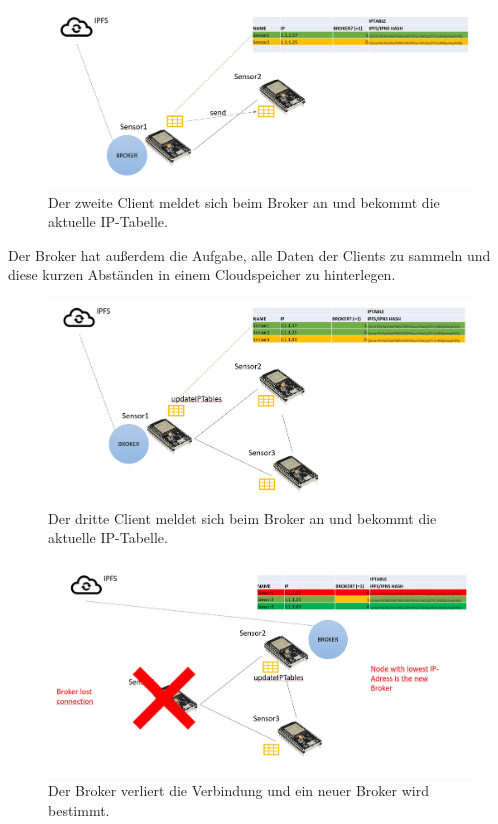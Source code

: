 \documentclass{article}
\begin{document}
\begin{figure}[h]
    \centering
    \includegraphics[width=1\linewidth]{Porposal/bild2.jpg}
    \caption{Der zweite Client meldet sich beim Broker an und bekommt die aktuelle IP-Tabelle.}
    \label{fig:statemachine}
\end{figure}

Der Broker hat außerdem die Aufgabe, alle Daten der Clients zu sammeln und diese kurzen Abständen in einem Cloudspeicher zu hinterlegen. 
\begin{figure}[h]
    \centering
    \includegraphics[width=1\linewidth]{Porposal/Bild3.jpg}
    \caption{Der dritte Client meldet sich beim Broker an und bekommt die aktuelle IP-Tabelle.}
    \label{fig:statemachine}
\end{figure}
\begin{figure}[h]
    \centering
    \includegraphics[width=1\linewidth]{Porposal/Bild4.jpg}
    \caption{Der Broker verliert die Verbindung und ein neuer Broker wird bestimmt. }
    \label{fig:statemachine}
\end{figure}
\end{document}
